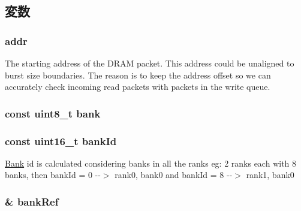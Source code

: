 \subsection{変数}
\hypertarget{classDRAMCtrl_1_1DRAMPacket_a0bb77b4ba61e408313e1118250f9278c}{
\subsubsection[{addr}]{ {\bf addr}}}
\label{classDRAMCtrl_1_1DRAMPacket_a0bb77b4ba61e408313e1118250f9278c}
The starting address of the DRAM packet. This address could be unaligned to burst size boundaries. The reason is to keep the address offset so we can accurately check incoming read packets with packets in the write queue. \hypertarget{classDRAMCtrl_1_1DRAMPacket_a8897945a64d084a58d8bbee43e74bbc6}{
\subsubsection[{bank}]{\setlength{\rightskip}{0pt plus 5cm}const uint8\_\-t {\bf bank}}}
\label{classDRAMCtrl_1_1DRAMPacket_a8897945a64d084a58d8bbee43e74bbc6}
\hypertarget{classDRAMCtrl_1_1DRAMPacket_a81996324dee2e231987a689d700a4dc2}{
\subsubsection[{bankId}]{\setlength{\rightskip}{0pt plus 5cm}const uint16\_\-t {\bf bankId}}}
\label{classDRAMCtrl_1_1DRAMPacket_a81996324dee2e231987a689d700a4dc2}
\hyperlink{classDRAMCtrl_1_1Bank}{Bank} id is calculated considering banks in all the ranks eg: 2 ranks each with 8 banks, then bankId = 0 -\/-\/$>$ rank0, bank0 and bankId = 8 -\/-\/$>$ rank1, bank0 \hypertarget{classDRAMCtrl_1_1DRAMPacket_ad74d737401d318ad6e3449a0826de315}{
\subsubsection[{bankRef}]{\& {\bf bankRef}}}
